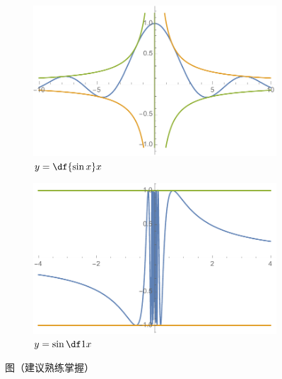 \begin{figure}[h]
	\begin{subfigure}[t]{0.45\textwidth}
		\centering
		\includegraphics[width=\textwidth]{./images/Ch01/1xsinx.pdf}
		\caption{$y=\df{\sin x}x$}
	\end{subfigure}\quad
	\begin{subfigure}[t]{0.45\textwidth}
		\centering
		\includegraphics[width=\textwidth]{./images/Ch01/sin1x.pdf}
		\caption{$y=\sin\df1x$}
	\end{subfigure}
	\caption{\exNo 图（建议熟练掌握）}
	\label{fig:sinFigures}
\end{figure}

